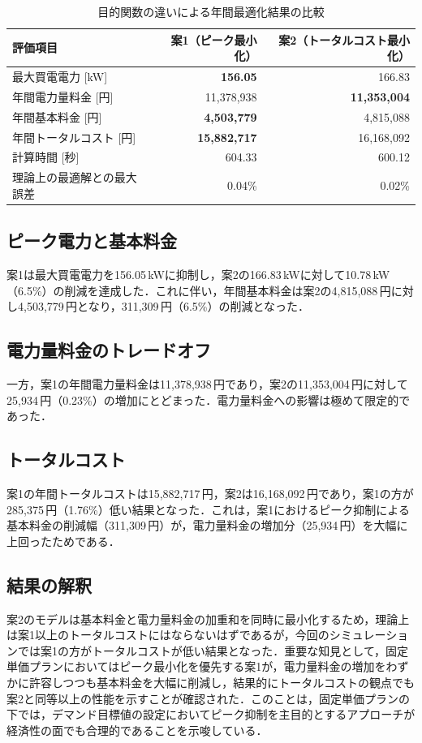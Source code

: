 \documentclass[a4paper,11pt,dvipdfmx]{jsarticle}
\begin{document}
\begin{table}[H]
    \centering
    \caption{目的関数の違いによる年間最適化結果の比較}
    \label{tab:comparison_results}
    \begin{tabular}{lrr}
        \toprule
        評価項目          & 案1（ピーク最小化）          & 案2（トータルコスト最小化）      \\
        \midrule
        最大買電電力 [kW]   & \textbf{156.05}     & 166.83              \\
        年間電力量料金 [円]   & 11,378,938          & \textbf{11,353,004} \\
        年間基本料金 [円]    & \textbf{4,503,779}  & 4,815,088           \\
        年間トータルコスト [円] & \textbf{15,882,717} & 16,168,092          \\
        \midrule
        計算時間 [秒]      & 604.33              & 600.12              \\
        理論上の最適解との最大誤差 & 0.04\%              & 0.02\%              \\
        \bottomrule
    \end{tabular}
\end{table}

\subsection*{ピーク電力と基本料金}
案1は最大買電電力を156.05\,kWに抑制し，案2の166.83\,kWに対して10.78\,kW（6.5\%）の削減を達成した．これに伴い，年間基本料金は案2の4,815,088\,円に対し4,503,779\,円となり，311,309\,円（6.5\%）の削減となった．

\subsection*{電力量料金のトレードオフ}
一方，案1の年間電力量料金は11,378,938\,円であり，案2の11,353,004\,円に対して25,934\,円（0.23\%）の増加にとどまった．電力量料金への影響は極めて限定的であった．

\subsection*{トータルコスト}
案1の年間トータルコストは15,882,717\,円，案2は16,168,092\,円であり，案1の方が285,375\,円（1.76\%）低い結果となった．これは，案1におけるピーク抑制による基本料金の削減幅（311,309\,円）が，電力量料金の増加分（25,934\,円）を大幅に上回ったためである．

\subsection*{結果の解釈}
案2のモデルは基本料金と電力量料金の加重和を同時に最小化するため，理論上は案1以上のトータルコストにはならないはずであるが，今回のシミュレーションでは案1の方がトータルコストが低い結果となった．重要な知見として，固定単価プランにおいてはピーク最小化を優先する案1が，電力量料金の増加をわずかに許容しつつも基本料金を大幅に削減し，結果的にトータルコストの観点でも案2と同等以上の性能を示すことが確認された．このことは，固定単価プランの下では，デマンド目標値の設定においてピーク抑制を主目的とするアプローチが経済性の面でも合理的であることを示唆している．
\end{document}
